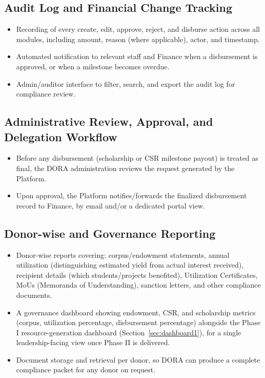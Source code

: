 \documentclass[11pt]{article}
\begin{document}
\subsection{Audit Log and Financial Change Tracking}
\label{sec:audit}
\begin{itemize}[leftmargin=1.4em, itemsep=3pt]
\item Recording of every create, edit, approve, reject, and disburse action across all modules, including amount, reason (where applicable), actor, and timestamp.
\item Automated notification to relevant staff and Finance when a disbursement is approved, or when a milestone becomes overdue.
\item Admin/auditor interface to filter, search, and export the audit log for compliance review.
\end{itemize}

\subsection{Administrative Review, Approval, and Delegation Workflow}
\label{sec:admin-review}
\begin{itemize}[leftmargin=1.4em, itemsep=3pt]
\item Before any disbursement (scholarship or CSR milestone payout) is treated as final, the DORA administration reviews the request generated by the Platform.
\item Upon approval, the Platform notifies/forwards the finalized disbursement record to Finance, by email and/or a dedicated portal view.
\end{itemize}

\subsection{Donor-wise and Governance Reporting}
\label{sec:reporting2}
\begin{itemize}[leftmargin=1.4em, itemsep=3pt]
\item Donor-wise reports covering: corpus/endowment statements, annual utilization (distinguishing estimated yield from actual interest received), recipient details (which students/projects benefited), Utilization Certificates, MoUs (Memoranda of Understanding), sanction letters, and other compliance documents.
\item A governance dashboard showing endowment, CSR, and scholarship metrics (corpus, utilization percentage, disbursement percentage) alongside the Phase I resource-generation dashboard (Section~\ref{sec:dashboard1}), for a single leadership-facing view once Phase II is delivered.
\item Document storage and retrieval per donor, so DORA can produce a complete compliance packet for any donor on request.
\end{itemize}
\end{document}
